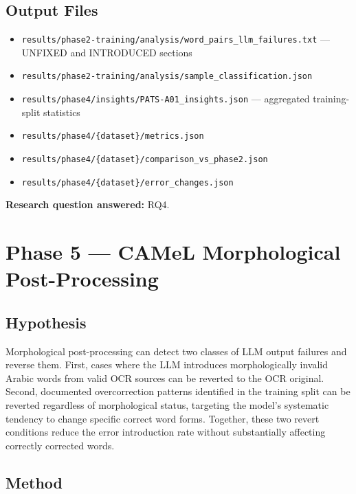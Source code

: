 \subsection{Output Files}
\begin{itemize}
  \item \texttt{results/phase2-training/analysis/word\_pairs\_llm\_failures.txt}
        --- UNFIXED and INTRODUCED sections
  \item \texttt{results/phase2-training/analysis/sample\_classification.json}
  \item \texttt{results/phase4/insights/PATS-A01\_insights.json} ---
        aggregated training-split statistics
  \item \texttt{results/phase4/\{dataset\}/metrics.json}
  \item \texttt{results/phase4/\{dataset\}/comparison\_vs\_phase2.json}
  \item \texttt{results/phase4/\{dataset\}/error\_changes.json}
\end{itemize}

\noindent
\textbf{Research question answered:} RQ4.

\section{Phase 5 --- CAMeL Morphological Post-Processing}
\label{sec:phase5}

\subsection{Hypothesis}
Morphological post-processing can detect two classes of LLM output failures
and reverse them. First, cases where the LLM introduces morphologically
invalid Arabic words from valid OCR sources can be reverted to the OCR
original. Second, documented overcorrection patterns identified in the
training split can be reverted regardless of morphological status, targeting
the model's systematic tendency to change specific correct word forms.
Together, these two revert conditions reduce the error introduction rate
without substantially affecting correctly corrected words.

\subsection{Method}
\label{subsec:phase5_method}

